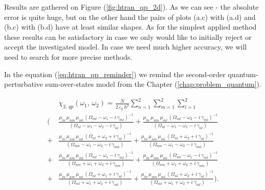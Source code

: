 \documentclass[12pt,twoside,a4paper]{article}
\numberwithin{equation}{subsection}
\numberwithin{figure}{subsection}
\begin{document}
Results are gathered on Figure (\ref{fig:htran_qp_2d}). As we can see - the absolute error is quite huge, but on the other hand the pairs of plots (a.c) with (a.d) and (b.c) with (b.d) have at least similar shapes. As for the simplest applied method these results can be satisfactory in case we only would like to initially reject or accept the investigated model. In case we need much higher accuracy, we will need to search for more precise methods.

In the equation (\ref{eq:htran_qp_reminder}) we remind the second-order quantum-perturbative sum-over-states model from the Chapter
(\ref{chap:problem_quantum}). 

\begin{equation} \label{eq:htran_qp_reminder}
  \begin{split} 
     & \chi_{2, \, qp}(\omega_1, \, \omega_2 ) = 
    \frac{N} {2 \, \varepsilon_0 \, h^2} \sum_{n=1}^{2} \sum_{m=1}^{2} \sum_{l=1}^{2} 
    \\ ( & \frac {{\mu_{ln}} \, {\mu_{nm}} \, {\mu_{ml}} \, ({\Omega_{ml}} - \omega_1 - i \, {\gamma_{ml}})^{-1} }
        {({\Omega_{nl}} - \omega_1 - \omega_2 - i \, {\gamma_{nl}}) }
       + \frac {{\mu_{ln}} \, {\mu_{nm}} \, {\mu_{ml}} \, ({\Omega_{ml}} - \omega_2 - i \, {\gamma_{ml}})^{-1} }
        {({\Omega_{nl}} - \omega_1 - \omega_1 - i \, {\gamma_{nl}}) } 
    \\ + & \frac {{\mu_{ln}} \, {\mu_{nm}} \, {\mu_{ml}} \, ({\Omega_{nl}} + \omega_2 + i \, {\gamma_{nl}})^{-1} }
        {({\Omega_{mn}} - \omega_1 - \omega_2 - i \, {\gamma_{mn}}) } 
       + \frac {{\mu_{ln}} \, {\mu_{nm}} \, {\mu_{ml}} \, ({\Omega_{nl}} + \omega_2 + i \, {\gamma_{nl}})^{-1} }
        {({\Omega_{mn}} - \omega_1 - \omega_2 - i \, {\gamma_{mn}}) } 
    \\ + & \frac {{\mu_{ln}} \, {\mu_{nm}} \, {\mu_{ml}} \, ({\Omega_{ml}} - \omega_1 - i \, {\gamma_{ml}})^{-1} }
        {({\Omega_{nm}} + \omega_1 + \omega_2 + i \, {\gamma_{nm}}) } 
       + \frac {{\mu_{ln}} \, {\mu_{nm}} \, {\mu_{ml}} \, ({\Omega_{ml}} - \omega_1 - i \, {\gamma_{ml}})^{-1} }
        {({\Omega_{nm}} + \omega_1 + \omega_2 + i \, {\gamma_{nm}}) } 
    \\ + & \frac {{\mu_{ln}} \, {\mu_{nm}} \, {\mu_{ml}} \, ({\Omega_{nl}} + \omega_1 + i \, {\gamma_{nl}})^{-1} }
        {({\Omega_{ml}} + \omega_1 + \omega_2 + i \, {\gamma_{ml}}) } 
       + \frac {{\mu_{ln}} \, {\mu_{nm}} \, {\mu_{ml}} \, ({\Omega_{nl}} + \omega_2 + i \, {\gamma_{nl}})^{-1} }
        {({\Omega_{ml}} + \omega_1 + \omega_2 + i \, {\gamma_{ml}})}).
  \end{split} 
\end{equation}
\end{document}
